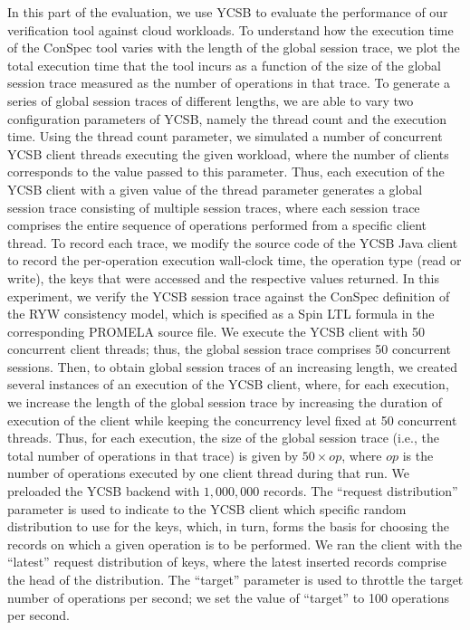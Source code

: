 \documentclass[journal, compsoc]{IEEEtran}
\begin{document}
	In this part of the evaluation, we use YCSB to evaluate the performance of our verification tool against cloud workloads.  To understand how the execution time of the ConSpec tool varies with the length of  the global session trace, we plot the total execution time that the tool incurs as a function of the size of the global session trace measured as the number of operations in that trace. To generate a series of global session traces of  different lengths, we are able to vary two configuration parameters of YCSB, namely the thread count and the execution time.  %
	Using the thread count parameter, we simulated a number of concurrent YCSB client threads executing the given workload, where the number of clients corresponds to the value passed to this parameter. Thus, each execution of the YCSB client with a given value of the thread parameter generates a global session trace consisting of multiple session traces, where each session trace comprises the entire sequence of operations performed from a specific client thread. To record each trace, we modify the source code of the YCSB Java client to record the per-operation execution wall-clock time, the operation type (read or write), the keys that were accessed and the respective values returned.
	In this experiment, we verify the YCSB session  trace against the ConSpec definition of the RYW consistency model, which is specified as a Spin LTL formula in the corresponding  PROMELA source file.
	We execute the YCSB client with 50 concurrent client threads; thus, the global session  trace comprises 50 concurrent sessions.
	Then, to obtain global session traces of an increasing length, we created several instances of an execution of the YCSB client, where, for each execution, we increase the length of the global session trace by increasing the  duration of execution of the client while keeping the concurrency level fixed at 50 concurrent threads. Thus, for each execution, the size of the global session trace (i.e., the total number of  operations in that trace) is given by $50 \times op$,  where $op$ is the number of operations executed by one client thread during that run.
	We  preloaded the YCSB backend with $1,000,000$ records.  The ``request distribution'' parameter is used to indicate to the YCSB client which specific random distribution to use for the keys, which, in turn, forms the basis for choosing the records on which a given operation is to be performed. We ran the client with the ``latest'' request distribution of keys, where the latest inserted records comprise the head of the distribution. The  ``target'' parameter is used to throttle  the target number of operations per second; we set the value of ``target'' to 100  operations per second. 
\end{document}

